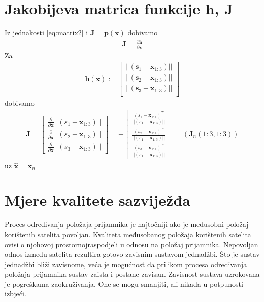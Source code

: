 \documentclass[a4paper,twoside,12pt]{memoir} %
\begin{document}
\chapter{Jakobijeva matrica funkcije $\mathbf{h}$, $\mathbf{J}$}
Iz jednakosti \ref{eq:matrix2} i $\mathbf{J} = \mathbf{p}(\mathbf{x})$ dobivamo
\begin{align}
\mathbf{J} = \frac{\partial \mathbf{h}}{\partial \mathbf{x}}
\end{align}
Za 
\begin{align}
\mathbf{h} (\mathbf{x}) := 
\begin{bmatrix}
||(\mathbf{s}_1-\mathbf{x}_{1:3})|| \\
||(\mathbf{s}_2-\mathbf{x}_{1:3})|| \\
||(\mathbf{s}_3-\mathbf{x}_{1:3})||\\
\end{bmatrix} 
\end{align}
dobivamo
\begin{align}
\mathbf{J} = \begin{bmatrix}
\frac{\partial}{\partial \mathbf{x}} ||(s_1-\mathbf{x}_{1:3})|| \\
\frac{\partial}{\partial \mathbf{x}} ||(s_2-\mathbf{x}_{1:3})||\\
\frac{\partial}{\partial \mathbf{x}} ||(s_3-\mathbf{x}_{1:3})|| 
\end{bmatrix}%
= - \begin{bmatrix}
\frac{(s_1-\mathbf{x}_{1:4})^T}{||(s_1-\mathbf{x}_{1:3})||} \\
\frac{(s_2-\mathbf{x}_{1:4})^T}{||(s_1-\mathbf{x}_{1:3})||}\\
\frac{(s_3-\mathbf{x}_{1:4})^T}{||(s_1-\mathbf{x}_{1:3})||} 
\end{bmatrix} = (\mathbf{J}_n(1:3,1:3))
\end{align}
uz $\hat{\mathbf{x}} = \mathbf{x}_n$
\chapter{Mjere kvalitete sazviježđa}\label{appendix:DOP}
Proces određivanja položaja prijamnika je najtočniji ako je međusobni položaj korištenih satelita povoljan.
Kvaliteta međusobanog položaja korištenih satelita ovisi o njohovoj prostornojraspodjeli u odnosu na
položaj prijamnika.
Nepovoljan odnos između satelita rezultira gotovo zavisnim sustavom jednadžbi. 
Što je sustav jednadžbi bliži zavisnome, veća je mogućnost da prilikom procesa određivanja položaja prijamnika sustav zaista i postane zavisan. Zavisnost sustava uzrokovana je pogreškama zaokruživanja. One se mogu smanjiti, ali nikada u potpunosti izbjeći.
\end{document}

